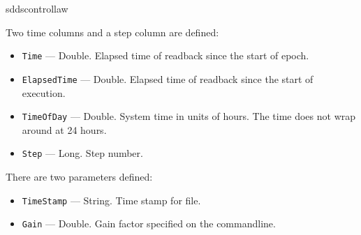 \begin{sddsprog}{sddscontrollaw}
\begin{itemize}
Two time columns and a step column are defined:
  \begin{itemize}
    \item {\tt Time} --- Double. Elapsed time of readback since the start of epoch.
    \item {\tt ElapsedTime} --- Double. Elapsed time of readback since the start of execution.
    \item {\tt TimeOfDay} --- Double. System time in units of hours. The time does not wrap around at 24 hours.
    \item {\tt Step} --- Long. Step number.
  \end{itemize}

There are two parameters defined:
  \begin{itemize}
    \item {\tt TimeStamp} --- String. Time stamp for file.
    \item {\tt Gain} --- Double. Gain factor specified on the commandline.
  \end{itemize}
\end{itemize}


\end{sddsprog}
